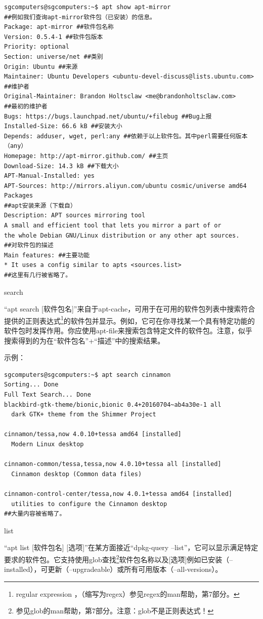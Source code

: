 \documentclass{book}
\begin{document}
\begin{verbatim}
sgcomputers@sgcomputers:~$ apt show apt-mirror
##例如我们查询apt-mirror软件包（已安装）的信息。
Package: apt-mirror ##软件包名称
Version: 0.5.4-1 ##软件包版本
Priority: optional
Section: universe/net ##类别
Origin: Ubuntu ##来源
Maintainer: Ubuntu Developers <ubuntu-devel-discuss@lists.ubuntu.com>
##维护者
Original-Maintainer: Brandon Holtsclaw <me@brandonholtsclaw.com>
##最初的维护者
Bugs: https://bugs.launchpad.net/ubuntu/+filebug ##Bug上报
Installed-Size: 66.6 kB ##安装大小
Depends: adduser, wget, perl:any ##依赖于以上软件包。其中perl需要任何版本（any）
Homepage: http://apt-mirror.github.com/ ##主页
Download-Size: 14.3 kB ##下载大小
APT-Manual-Installed: yes
APT-Sources: http://mirrors.aliyun.com/ubuntu cosmic/universe amd64 Packages
##apt安装来源（下载自）
Description: APT sources mirroring tool
A small and efficient tool that lets you mirror a part of or
the whole Debian GNU/Linux distribution or any other apt sources.
##对软件包的描述
Main features: ##主要功能
* It uses a config similar to apts <sources.list>
##这里有几行被省略了。
\end{verbatim}
\begin{center} search \end{center}
“apt search [软件包名]”来自于apt-cache，可用于在可用的软件包列表中搜索符合提供的正则表达式\footnote{regular expression ，（缩写为regex）参见regex的man帮助，第7部分。}的软件包并显示。例如，它可在你寻找某一个具有特定功能的软件包时发挥作用。你应使用apt-file来搜索包含特定文件的软件包。注意，似乎搜索得到的为在“软件包名”+“描述”中的搜索结果。\par
示例：
\begin{verbatim}
sgcomputers@sgcomputers:~$ apt search cinnamon
Sorting... Done
Full Text Search... Done
blackbird-gtk-theme/bionic,bionic 0.4+20160704~ab4a30e-1 all
  dark GTK+ theme from the Shimmer Project

cinnamon/tessa,now 4.0.10+tessa amd64 [installed]
  Modern Linux desktop

cinnamon-common/tessa,tessa,now 4.0.10+tessa all [installed]
  Cinnamon desktop (Common data files)

cinnamon-control-center/tessa,now 4.0.1+tessa amd64 [installed]
  utilities to configure the Cinnamon desktop
##大量内容被省略了。
\end{verbatim}
\begin{center} list \end{center}
“apt list [软件包名] [选项]”在某方面接近“dpkg-query --list”，它可以显示满足特定要求的软件包。它支持使用glob查找\footnote{参见glob的man帮助，第7部分。注意：glob不是正则表达式！}软件包名称以及[选项]例如已安装（--installed），可更新（--upgradeable）或所有可用版本（--all-versions）。\par
\end{document}
